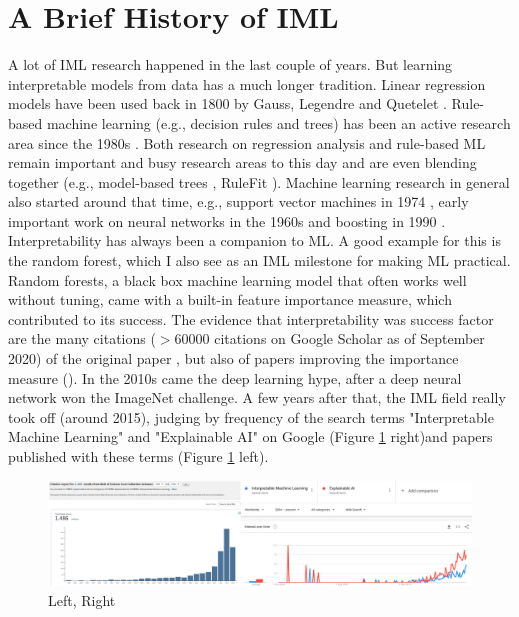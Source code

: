 \documentclass[runningheads]{llncs}
\begin{document}
\section{A Brief History of IML}
A lot of IML research happened in the last couple of years.
But learning interpretable models from data has a much longer tradition.
Linear regression models have been used back in 1800 by Gauss, Legendre and Quetelet \cite{stigler1986history,legendre1805nouvelles,gauss1809theoria,quetelet1827recherches}.
Rule-based machine learning (e.g., decision rules and trees) has been an active research area since the 1980s \cite{furnkranz2012foundations}.
Both research on regression analysis and rule-based ML remain important and busy research areas to this day and are even blending together (e.g., model-based trees \cite{zeileis2008model}, RuleFit \cite{friedman2008predictive}).
Machine learning research in general also started around that time, e.g., support vector machines in 1974 \cite{vapnik1974theory}, early important work on neural networks in the 1960s \cite{schmidhuber2015deep} and boosting in 1990 \cite{schapire1990strength}.
Interpretability has always been a companion to ML.
A good example for this is the random forest, which I also see as an IML milestone for making ML practical.
Random forests, a black box machine learning model that often works well without tuning, came with a built-in feature importance measure, which contributed to its success.
The evidence that interpretability was success factor are the many citations ($>60000$ citations on Google Scholar as of September 2020) of the original paper \cite{breiman2001random}, but also of papers improving the importance measure (\cite{strobl2008conditional,strobl2007bias,hapfelmeier2014new,ishwaran2007variable}).
In the 2010s came the deep learning hype, after a deep neural network won the ImageNet challenge.
A few years after that, the IML field really took off (around 2015), judging by frequency of the search terms "Interpretable Machine Learning" and "Explainable AI" on Google (Figure \ref{fig:count} right)and papers published with these terms (Figure \ref{fig:count} left).
\begin{figure}
  \includegraphics[width=\textwidth]{citation-search.png}
  \caption{Left, Right}
  \label{fig:count}
\end{figure}
\end{document}
